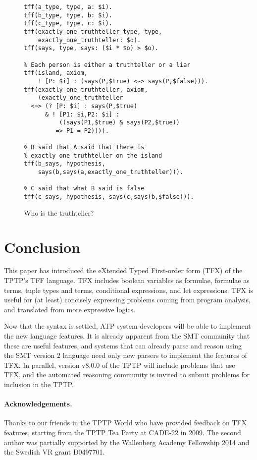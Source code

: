 \begin{figure}
\begin{lstlisting}[language=tptp]
tff(a_type, type, a: $i).
tff(b_type, type, b: $i).
tff(c_type, type, c: $i).
tff(exactly_one_truthteller_type, type,
    exactly_one_truthteller: $o).
tff(says, type, says: ($i * $o) > $o).

% Each person is either a truthteller or a liar
tff(island, axiom,
    ! [P: $i] : (says(P,$true) <~> says(P,$false))).
tff(exactly_one_truthteller, axiom,
    (exactly_one_truthteller
  <=> (? [P: $i] : says(P,$true)
      & ! [P1: $i,P2: $i] :
          ((says(P1,$true) & says(P2,$true))
         => P1 = P2)))).

% B said that A said that there is
% exactly one truthteller on the island
tff(b_says, hypothesis,
    says(b,says(a,exactly_one_truthteller))).

% C said that what B said is false
tff(c_says, hypothesis, says(c,says(b,$false))).
\end{lstlisting}
\caption{Who is the truthteller?}
\label{fig:tfx/Truthteller}
\end{figure}

\section{Conclusion}
\label{sec:tfx/Conclusion}

This paper has introduced the eXtended Typed First-order form (TFX) of the
TPTP's TFF language.
TFX includes boolean variables as formulae, formulae as terms, tuple types and
terms, conditional expressions, and let expressions.
TFX is useful for (at least) concisely expressing problems coming from 
program analysis, and translated from more expressive logics.

Now that the syntax is settled, ATP system developers will be able to
implement the new language features.
It is already apparent from the SMT community that these are useful features,
and systems that can already parse and reason using the SMT version 2 language 
need only new parsers to implement the features of TFX.
In parallel, version v8.0.0 of the TPTP will include problems that use TFX,
and the automated reasoning community is invited to submit problems for
inclusion in the TPTP.

\paragraph{Acknowledgements.}
Thanks to our friends in the TPTP World who have provided feedback on TFX
features, starting from the TPTP Tea Party at CADE-22 in 2009. The second
author was partially supported by the Wallenberg Academy Fellowship 2014 and
the Swedish VR grant D0497701.